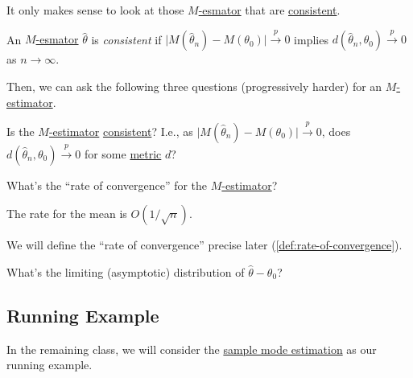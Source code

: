 It only makes sense to look at those \hyperref[prb:M-estimation]{\(M\)-esmator} that are \hyperref[def:consistent]{consistent}.

\begin{definition}[Consistent]\label{def:consistent}
	An \hyperref[prb:M-estimation]{\(M\)-esmator} \(\hat{\theta} \) is \emph{consistent} if \(\vert M(\hat{\theta} _n) - M(\theta _0) \vert \overset{p}{\to } 0\) implies \(d(\hat{\theta} _n, \theta _0) \overset{p}{\to } 0\) as \(n\to \infty \).
\end{definition}

Then, we can ask the following three questions (progressively harder) for an \hyperref[prb:M-estimation]{\(M\)-estimator}.

\begin{problem}[Consistency]\label{prb:consistency}
Is the \hyperref[prb:M-estimation]{\(M\)-estimator} \hyperref[def:consistent]{consistent}? I.e., as \(\vert M(\hat{\theta} _n) - M(\theta _0) \vert \overset{p}{\to } 0\), does \(d(\hat{\theta} _n, \theta _0) \overset{p}{\to } 0\) for some \hyperref[def:pseudo-metric]{metric} \(d\)?
\end{problem}

\begin{problem}\label{prb:rate-of-convergence}
What's the ``rate of convergence'' for the \hyperref[prb:M-estimation]{\(M\)-estimator}?
\end{problem}

\begin{eg}
	The rate for the mean is \(O(1 / \sqrt{n} )\).
\end{eg}

We will define the ``rate of convergence'' precise later (\autoref{def:rate-of-convergence}).

\begin{problem}\label{prb:limiting-distribution}
What's the limiting (asymptotic) distribution of \(\hat{\theta} - \theta _0\)?
\end{problem}

\subsection{Running Example}
In the remaining class, we will consider the \hyperref[eg:mode-estimation]{sample mode estimation} as our running example.

